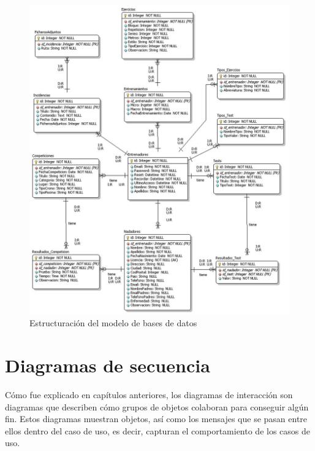     	 \begin{figure}[H]
    		  \centering
    		    \includegraphics[width=13cm]{./eps/di_modelo_er/ModeloER.eps}
    		  \caption{Estructuración del modelo de bases de datos}
    		  \label{fig:di_diag_despliegue}
    		\end{figure}
			
		
	
	\section{Diagramas de secuencia} %
		\label{sec:diagramas_de_secuencia}
	
		Cómo fue explicado en capítulos anteriores, los diagramas de interacción son diagramas que describen cómo grupos de objetos colaboran para conseguir algún fin. Estos diagramas muestran objetos, así como los mensajes que se pasan entre ellos dentro del caso de uso, es decir, capturan el comportamiento de los casos de uso.
		
